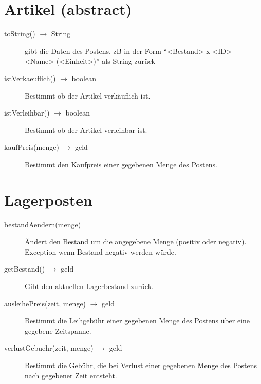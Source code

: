 \documentclass[a4paper,12pt,titlepage]{article}
\begin{document}
\section{Artikel (abstract)}
\begin{description}
\item[toString() $\rightarrow$ String]
gibt die Daten des Postens, zB in der Form \enquote{<Bestand> x <ID> <Name> (<Einheit>)} als String zurück
\item[istVerkaeuflich() $\rightarrow$ boolean]
Bestimmt ob der Artikel verkäuflich ist.
\item[istVerleihbar() $\rightarrow$ boolean]
Bestimmt ob der Artikel verleihbar ist.
\item[kaufPreis(menge) $\rightarrow$ geld]
Bestimmt den Kaufpreis einer gegebenen Menge des Postens.
\end{description}
\section{Lagerposten}
\begin{description}
\item[bestandAendern(menge)]
Ändert den Bestand um die angegebene Menge (positiv oder negativ). \\
Exception wenn Bestand negativ werden würde.
\item[getBestand() $\rightarrow$ geld]
Gibt den aktuellen Lagerbestand zurück.
\item[ausleihePreis(zeit, menge) $\rightarrow$ geld]
Bestimmt die Leihgebühr einer gegebenen Menge des Postens über eine gegebene Zeitspanne.
\item[verlustGebuehr(zeit, menge) $\rightarrow$ geld]
Bestimmt die Gebühr, die bei Verlust einer gegebenen Menge des Postens nach gegebener Zeit entsteht.
\end{description}
\end{document}
